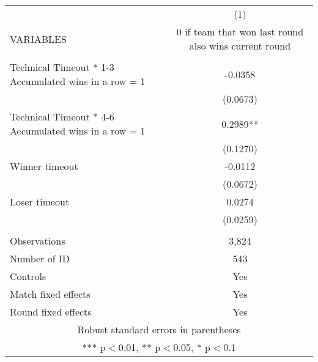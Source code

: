 \documentclass[]{article}
\begin{document}
\begin{tabular}{lc} \hline
 & (1) \\
VARIABLES & 0 if team that won last round also wins current round \\ \hline
 &  \\
Technical Timeout * 1-3 Accumulated wins in a row = 1 & -0.0358 \\
 & (0.0673) \\
Technical Timeout * 4-6 Accumulated wins in a row = 1 & 0.2989** \\
 & (0.1270) \\
Winner timeout & -0.0112 \\
 & (0.0672) \\
Loser timeout & 0.0274 \\
 & (0.0259) \\
 &  \\
Observations & 3,824 \\
Number of ID & 543 \\
Controls & Yes \\
Match fixed effects & Yes \\
 Round fixed effects & Yes \\ \hline
\multicolumn{2}{c}{ Robust standard errors in parentheses} \\
\multicolumn{2}{c}{ *** p$<$0.01, ** p$<$0.05, * p$<$0.1} \\
\end{tabular}
\end{document}

